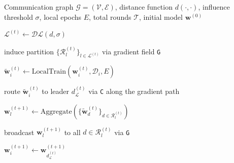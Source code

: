\begin{algorithm}[t]
  \caption{General Field-Based Federated Learning round.}
  \label{algo:fbfl-general}
  \begin{algorithmic}[1]
    \Require Communication graph
             \(\mathcal{G}=(\mathcal{V},\mathcal{E})\),
             distance function \(d(\cdot,\cdot)\),
             influence threshold \(\sigma\),
             local epochs \(E\),
             total rounds \(\mathcal{T}\),
             initial model \(\mathbf{w}^{(0)}\)

      \State
        \(\mathcal{L}^{(t)} \gets \mathcal{DL}(d,\sigma)\)

      \State
        induce partition
        \(\{\mathcal{R}_l^{(t)}\}_{l \in \mathcal{L}^{(t)}}\)
        via gradient field \texttt{G}


        \State
          \(\tilde{\mathbf{w}}_i^{(t)}
          \gets
          \mathrm{LocalTrain}
          (\mathbf{w}_i^{(t)},\mathcal{D}_i,E)\)

        \State
          route \(\tilde{\mathbf{w}}_i^{(t)}\) to leader
          \(d_{\mathcal{L}}^{(t)}\) via \texttt{C}
          along the gradient path
      \EndFor


        \State
          \(\mathbf{w}_l^{(t+1)}
          \gets
          \mathrm{Aggregate}
          \left(
            \{\tilde{\mathbf{w}}_d^{(t)}\}_{d \in \mathcal{R}_l^{(t)}}
          \right)\)

        \State
          broadcast \(\mathbf{w}_l^{(t+1)}\) to all
          \(d \in \mathcal{R}_l^{(t)}\) via \texttt{G}
      \EndFor

        \State
          \(\mathbf{w}_i^{(t+1)}
          \gets
          \mathbf{w}_{d_{\mathcal{L}}^{(t)}}^{(t+1)}\)
      \EndFor
    \EndFor
  \end{algorithmic}
\end{algorithm}

